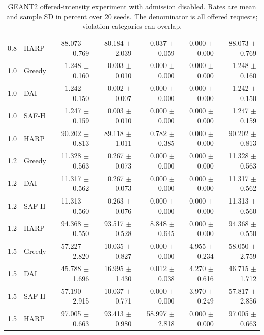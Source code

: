 \begin{table}[p]
\begin{tabular}{llrrrrr}
0.8 & HARP & 88.073 $\pm$ 0.769 & 80.184 $\pm$ 2.039 & 0.037 $\pm$ 0.059 & 0.000 $\pm$ 0.000 & 88.073 $\pm$ 0.769 \\
1.0 & Greedy & 1.248 $\pm$ 0.160 & 0.003 $\pm$ 0.010 & 0.000 $\pm$ 0.000 & 0.000 $\pm$ 0.000 & 1.248 $\pm$ 0.160 \\
1.0 & DAI & 1.242 $\pm$ 0.150 & 0.002 $\pm$ 0.007 & 0.000 $\pm$ 0.000 & 0.000 $\pm$ 0.000 & 1.242 $\pm$ 0.150 \\
1.0 & SAF-H & 1.247 $\pm$ 0.159 & 0.003 $\pm$ 0.010 & 0.000 $\pm$ 0.000 & 0.000 $\pm$ 0.000 & 1.247 $\pm$ 0.159 \\
1.0 & HARP & 90.202 $\pm$ 0.813 & 89.118 $\pm$ 1.011 & 0.782 $\pm$ 0.385 & 0.000 $\pm$ 0.000 & 90.202 $\pm$ 0.813 \\
1.2 & Greedy & 11.328 $\pm$ 0.563 & 0.267 $\pm$ 0.073 & 0.000 $\pm$ 0.000 & 0.000 $\pm$ 0.000 & 11.328 $\pm$ 0.563 \\
1.2 & DAI & 11.317 $\pm$ 0.562 & 0.267 $\pm$ 0.073 & 0.000 $\pm$ 0.000 & 0.000 $\pm$ 0.000 & 11.317 $\pm$ 0.562 \\
1.2 & SAF-H & 11.313 $\pm$ 0.560 & 0.263 $\pm$ 0.076 & 0.000 $\pm$ 0.000 & 0.000 $\pm$ 0.000 & 11.313 $\pm$ 0.560 \\
1.2 & HARP & 94.368 $\pm$ 0.550 & 93.517 $\pm$ 0.528 & 8.848 $\pm$ 0.645 & 0.000 $\pm$ 0.000 & 94.368 $\pm$ 0.550 \\
1.5 & Greedy & 57.227 $\pm$ 2.820 & 10.035 $\pm$ 0.827 & 0.000 $\pm$ 0.000 & 4.955 $\pm$ 0.234 & 58.050 $\pm$ 2.759 \\
1.5 & DAI & 45.788 $\pm$ 1.696 & 16.995 $\pm$ 1.430 & 0.012 $\pm$ 0.038 & 4.270 $\pm$ 0.616 & 46.715 $\pm$ 1.712 \\
1.5 & SAF-H & 57.190 $\pm$ 2.915 & 10.037 $\pm$ 0.771 & 0.000 $\pm$ 0.000 & 3.970 $\pm$ 0.249 & 57.817 $\pm$ 2.856 \\
1.5 & HARP & 97.005 $\pm$ 0.663 & 93.413 $\pm$ 0.980 & 58.997 $\pm$ 2.818 & 0.000 $\pm$ 0.000 & 97.005 $\pm$ 0.663 \\
\bottomrule
\end{tabular}
\caption{GEANT2 offered-intensity experiment with admission disabled. Rates are mean and sample SD in percent over 20 seeds. The denominator is all offered requests; violation categories can overlap.}
\label{tab:load_sweep_unprotected_geant2}
\end{table}
